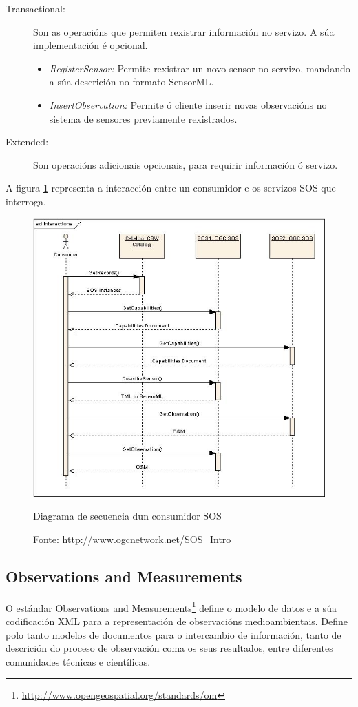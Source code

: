 \begin{description}
\begin{itemize}
\end{itemize}
\item[Transactional:] Son as operacións que permiten rexistrar información no servizo. A súa implementación é opcional.
\begin{itemize}
\item \textit{RegisterSensor:} Permite rexistrar un novo sensor no servizo, mandando a súa descrición no formato SensorML.
\item \textit{InsertObservation:} Permite ó cliente inserir novas observacións no sistema de sensores previamente rexistrados.
\end{itemize}
\item[Extended:] Son operacións adicionais opcionais, para requirir información ó servizo.
\end{description}

A figura \ref{fig:uml-sos} representa a interacción entre un consumidor e os servizos SOS que interroga.

\begin{figure}[hbtp]
  \centering
  \includegraphics[width=.85\textwidth]{images/SOS_consumer_seq.png}
  \caption{Diagrama de secuencia dun consumidor SOS}
  \label{fig:uml-sos}
  \caption*{Fonte: \url{http://www.ogcnetwork.net/SOS_Intro}}
\end{figure}

\subsection{Observations and Measurements}
O estándar Observations and Measurements\footnote{\url{http://www.opengeospatial.org/standards/om}} define o modelo de datos e a súa codificación XML para a representación de observacións medioambientais. Define polo tanto modelos de documentos para o intercambio de información, tanto de descrición do proceso de observación coma os seus resultados, entre diferentes comunidades técnicas e científicas.

